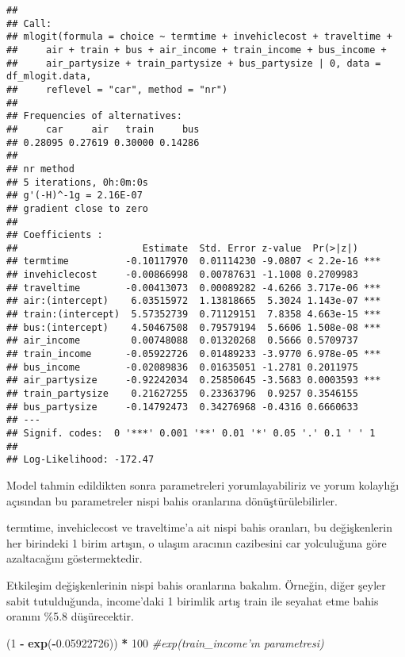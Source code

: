 \documentclass[
]{book}
\newenvironment{Shaded}{\begin{snugshade}}{\end{snugshade}}
\newcommand{\CommentTok}[1]{\textcolor[rgb]{0.56,0.35,0.01}{\textit{#1}}}
\newcommand{\DecValTok}[1]{\textcolor[rgb]{0.00,0.00,0.81}{#1}}
\newcommand{\FloatTok}[1]{\textcolor[rgb]{0.00,0.00,0.81}{#1}}
\newcommand{\KeywordTok}[1]{\textcolor[rgb]{0.13,0.29,0.53}{\textbf{#1}}}
\newcommand{\NormalTok}[1]{#1}
\newcommand{\OperatorTok}[1]{\textcolor[rgb]{0.81,0.36,0.00}{\textbf{#1}}}
\newcommand{\StringTok}[1]{\textcolor[rgb]{0.31,0.60,0.02}{#1}}
\begin{document}
\begin{verbatim}
## 
## Call:
## mlogit(formula = choice ~ termtime + invehiclecost + traveltime + 
##     air + train + bus + air_income + train_income + bus_income + 
##     air_partysize + train_partysize + bus_partysize | 0, data = df_mlogit.data, 
##     reflevel = "car", method = "nr")
## 
## Frequencies of alternatives:
##     car     air   train     bus 
## 0.28095 0.27619 0.30000 0.14286 
## 
## nr method
## 5 iterations, 0h:0m:0s 
## g'(-H)^-1g = 2.16E-07 
## gradient close to zero 
## 
## Coefficients :
##                      Estimate  Std. Error z-value  Pr(>|z|)    
## termtime          -0.10117970  0.01114230 -9.0807 < 2.2e-16 ***
## invehiclecost     -0.00866998  0.00787631 -1.1008 0.2709983    
## traveltime        -0.00413073  0.00089282 -4.6266 3.717e-06 ***
## air:(intercept)    6.03515972  1.13818665  5.3024 1.143e-07 ***
## train:(intercept)  5.57352739  0.71129151  7.8358 4.663e-15 ***
## bus:(intercept)    4.50467508  0.79579194  5.6606 1.508e-08 ***
## air_income         0.00748088  0.01320268  0.5666 0.5709737    
## train_income      -0.05922726  0.01489233 -3.9770 6.978e-05 ***
## bus_income        -0.02089836  0.01635051 -1.2781 0.2011975    
## air_partysize     -0.92242034  0.25850645 -3.5683 0.0003593 ***
## train_partysize    0.21627255  0.23363796  0.9257 0.3546155    
## bus_partysize     -0.14792473  0.34276968 -0.4316 0.6660633    
## ---
## Signif. codes:  0 '***' 0.001 '**' 0.01 '*' 0.05 '.' 0.1 ' ' 1
## 
## Log-Likelihood: -172.47
\end{verbatim}

Model tahmin edildikten sonra parametreleri yorumlayabiliriz ve yorum kolaylığı açısından bu parametreler nispi bahis oranlarına dönüştürülebilirler.

termtime, invehiclecost ve traveltime'a ait nispi bahis oranları, bu değişkenlerin her birindeki 1 birim artışın, o ulaşım aracının cazibesini car yolculuğuna göre azaltacağını göstermektedir.

Etkileşim değişkenlerinin nispi bahis oranlarına bakalım. Örneğin, diğer şeyler sabit tutulduğunda, income'daki 1 birimlik artış train ile seyahat etme bahis oranını \%5.8 düşürecektir.

\begin{Shaded}
\begin{Highlighting}[]
\NormalTok{(}\DecValTok{1} \OperatorTok{-}\StringTok{ }\KeywordTok{exp}\NormalTok{(}\OperatorTok{-}\FloatTok{0.05922726}\NormalTok{)) }\OperatorTok{*}\StringTok{ }\DecValTok{100} \CommentTok{#exp(train_income'ın parametresi)}
\end{Highlighting}
\end{Shaded}
\end{document}
